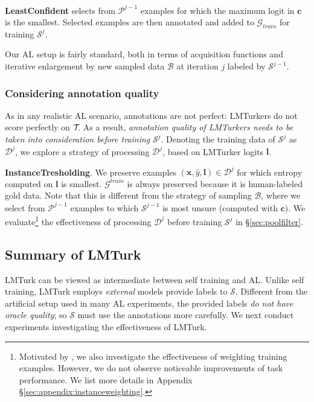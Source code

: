 \documentclass[11pt]{article}
\def\tasksymbol{$\mathcal{T\mkern-5mu}$\xspace}
\def\md{LMTurk\xspace}
\def\mdr{LMTurker\xspace}
\def\mdrs{LMTurkers\xspace}
\def\secref#1{\S\ref{sec:#1}}
\def\seclabel#1{\label{sec:#1}}
\begin{document}
\textbf{LeastConfident}
selects from $\mathcal{P}^{j-1}$
examples for which the maximum
logit in $\mathbf{c}$ is the smallest.
Selected examples are then annotated 
and added to $\mathcal{G}_{train}$
for training $\mathcal{S}^{j}$.

Our AL setup is fairly standard, both in terms of
acquisition functions
and iterative enlargement by new
sampled data $\mathcal{B}$ at iteration
$j$ labeled by $\mathcal{S}^{j-1}$.


\subsubsection{Considering annotation quality}
\seclabel{instancetresholdingintro}
As in any realistic AL scenario, annotations are not perfect:
\mdrs
do not score perfectly on \tasksymbol.
As a result,
\emph{annotation quality of \mdrs
needs to be taken into consideration
before training} $\mathcal{S}^{j}$.
Denoting the training data of
$\mathcal{S}^{j}$ as $\mathcal{D}^{j}$,
we explore
a strategy of processing
$\mathcal{D}^{j}$, based on 
\mdr logits $\mathbf{l}$.


\textbf{InstanceTresholding}.
We preserve examples
$(\mathbf{x}, \hat{y}, \mathbf{l}) \in \mathcal{D}^{j}$
for which entropy computed on
$\mathbf{l}$
is smallest.
$\mathcal{G}^{train}$ is always preserved because it
is human-labeled gold data.
Note that this is
different from the strategy of
sampling $\mathcal{B}$, where
we select from
$\mathcal{P}^{j-1}$
examples to which $\mathcal{S}^{j-1}$
is most unsure (computed with $\mathbf{c}$).
We evaluate\footnote{
Motivated by \citet{wang-etal-2017-instance},
we also investigate the effectiveness of
weighting training examples. However,
we do not observe noticeable improvements of
task performance. We list more details  in
Appendix \secref{appendix:instanceweighting}.}
the effectiveness
of processing $\mathcal{D}^j$
before training $\mathcal{S}^j$
in \secref{poolfilter}.









\subsection{Summary of \md}
\md can be viewed as
intermediate  between
self training \citep{yarowsky-1995-unsupervised,abney-2004-understanding,lee2013pseudo,mi2021self}
and AL.
Unlike self training, \md employs
\emph{external} models provide labels to
$\mathcal{S}$.
Different from the artificial setup used in many AL
experiments, the provided labels
\emph{do not have oracle quality};
so $\mathcal{S}$
must use the annotations more carefully.
We next conduct experiments
investigating the effectiveness of \md.
\end{document}

